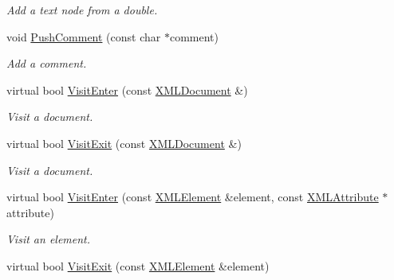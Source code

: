 \begin{DoxyCompactItemize}
\begin{DoxyCompactList}\small\item\em Add a text node from a double. \end{DoxyCompactList}\item 
\hypertarget{classtinyxml2_1_1_x_m_l_printer_a81ecae2990489f01fc7dafd725c2f1de}{void \hyperlink{classtinyxml2_1_1_x_m_l_printer_a81ecae2990489f01fc7dafd725c2f1de}{Push\-Comment} (const char $\ast$comment)}\label{classtinyxml2_1_1_x_m_l_printer_a81ecae2990489f01fc7dafd725c2f1de}

\begin{DoxyCompactList}\small\item\em Add a comment. \end{DoxyCompactList}\item 
\hypertarget{classtinyxml2_1_1_x_m_l_printer_a5fd7b84ddc361aa4512352a8be9cbc35}{virtual bool \hyperlink{classtinyxml2_1_1_x_m_l_printer_a5fd7b84ddc361aa4512352a8be9cbc35}{Visit\-Enter} (const \hyperlink{classtinyxml2_1_1_x_m_l_document}{X\-M\-L\-Document} \&)}\label{classtinyxml2_1_1_x_m_l_printer_a5fd7b84ddc361aa4512352a8be9cbc35}

\begin{DoxyCompactList}\small\item\em Visit a document. \end{DoxyCompactList}\item 
\hypertarget{classtinyxml2_1_1_x_m_l_printer_aacbd61d4f7d629a11c8d7acb3f928a8c}{virtual bool \hyperlink{classtinyxml2_1_1_x_m_l_printer_aacbd61d4f7d629a11c8d7acb3f928a8c}{Visit\-Exit} (const \hyperlink{classtinyxml2_1_1_x_m_l_document}{X\-M\-L\-Document} \&)}\label{classtinyxml2_1_1_x_m_l_printer_aacbd61d4f7d629a11c8d7acb3f928a8c}

\begin{DoxyCompactList}\small\item\em Visit a document. \end{DoxyCompactList}\item 
\hypertarget{classtinyxml2_1_1_x_m_l_printer_a29372a07b5a0ac5e7b2e21baff946b17}{virtual bool \hyperlink{classtinyxml2_1_1_x_m_l_printer_a29372a07b5a0ac5e7b2e21baff946b17}{Visit\-Enter} (const \hyperlink{classtinyxml2_1_1_x_m_l_element}{X\-M\-L\-Element} \&element, const \hyperlink{classtinyxml2_1_1_x_m_l_attribute}{X\-M\-L\-Attribute} $\ast$attribute)}\label{classtinyxml2_1_1_x_m_l_printer_a29372a07b5a0ac5e7b2e21baff946b17}

\begin{DoxyCompactList}\small\item\em Visit an element. \end{DoxyCompactList}\item 
\hypertarget{classtinyxml2_1_1_x_m_l_printer_a6a32e6194a3f9ce1ea3a66b2f32f48d2}{virtual bool \hyperlink{classtinyxml2_1_1_x_m_l_printer_a6a32e6194a3f9ce1ea3a66b2f32f48d2}{Visit\-Exit} (const \hyperlink{classtinyxml2_1_1_x_m_l_element}{X\-M\-L\-Element} \&element)}\label{classtinyxml2_1_1_x_m_l_printer_a6a32e6194a3f9ce1ea3a66b2f32f48d2}


\end{DoxyCompactItemize}
